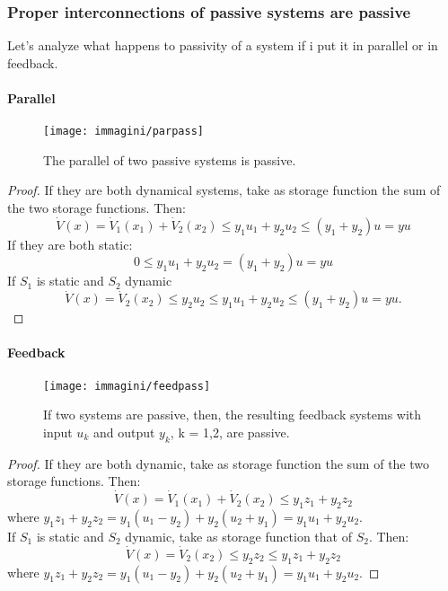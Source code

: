 \subsubsection{Proper interconnections of passive systems are passive}
Let's analyze what happens to passivity of a system if i put it in parallel or in feedback.
\paragraph{Parallel}
\begin{figure}[H]
	\centering
	\texttt{[image: immagini/parpass]}
	\caption{The parallel of two passive systems is passive.}
	\label{fig:parpass}
\end{figure}
\begin{proof}
	If they are both dynamical systems, take as storage function the sum of the two storage functions. Then:\[	\dot{V}(x)=\dot{V}_1(x_1)+\dot{V}_2(x_2)\le y_1u_1+y_2u_2\le (y_1+y_2)u=yu\] If they are both static:\[0\le y_1u_1+y_2u_2=(y_1+y_2)u=yu\] If $S_1$ is static and $S_2$ dynamic \[\dot{V}(x)=\dot{V}_2(x_2)\le y_2u_2\le y_1u_1+y_2u_2\le (y_1+y_2)u=yu.\]
\end{proof}
\paragraph{Feedback}
\begin{figure}[H]
	\centering
	\texttt{[image: immagini/feedpass]}
	\caption{If two systems are passive, then, the resulting feedback systems with input $u_k$ and output $y_k$, k = 1,2, are passive.}
	\label{fig:feedpass}
\end{figure}
\begin{proof}
	If they are both dynamic, take as storage function the sum of the two storage functions. Then: \[\dot{V}(x)=\dot{V}_1(x_1)+\dot{V}_2(x_2)\le y_1z_1+y_2z_2\] where $y_1z_1+y_2z_2=y_1(u_1-y_2)+y_2(u_2+y_1)=y_1u_1+y_2u_2$.
	\\ If $S_1$ is static and $S_2$ dynamic, take as storage function that of $S_2$. Then: \[
	\dot{V}(x)=\dot{V}_2(x_2)\le y_2z_2\le y_1z_1 +y_2z_2
	\] where $y_1z_1+y_2z_2=y_1(u_1-y_2)+y_2(u_2+y_1)=y_1u_1+y_2u_2$.
\end{proof}

